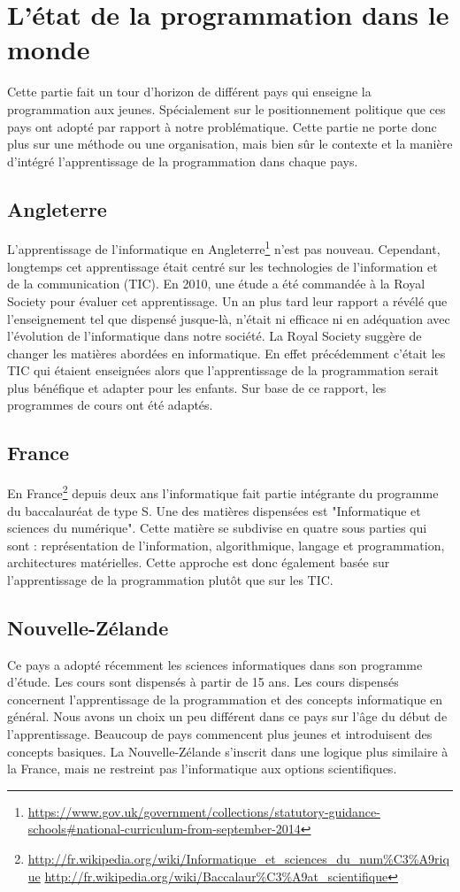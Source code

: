 \section{L'état de la programmation dans le monde}
\label{monde}
Cette partie fait un tour d'horizon de différent pays qui enseigne la programmation aux jeunes. Spécialement sur le positionnement politique que ces pays ont adopté par rapport à notre problématique. Cette partie ne porte donc plus sur une méthode ou une organisation, mais bien sûr le contexte et la manière d'intégré l'apprentissage de la programmation dans chaque pays.
\subsection{Angleterre}
L'apprentissage de l'informatique en Angleterre\footnote{\url{https://www.gov.uk/government/collections/statutory-guidance-schools\#national-curriculum-from-september-2014}} n'est pas nouveau. Cependant, longtemps cet apprentissage était centré sur les technologies de l'information et de la communication (TIC). En 2010, une étude a été commandée à la Royal Society pour évaluer cet apprentissage. Un an plus tard leur rapport a révélé que l'enseignement tel que dispensé jusque-là, n'était ni efficace ni en adéquation avec l'évolution de l'informatique dans notre société. La Royal Society suggère de changer les matières abordées en informatique. En effet précédemment c'était les TIC qui étaient enseignées alors que l'apprentissage de la programmation serait plus bénéfique et adapter pour les enfants. Sur base de ce rapport, les programmes de cours ont été adaptés.

\subsection{France}
En France\footnote{\url{http://fr.wikipedia.org/wiki/Informatique\_et\_sciences\_du\_num\%C3\%A9rique}
\url{http://fr.wikipedia.org/wiki/Baccalaur\%C3\%A9at\_scientifique}} depuis deux ans l'informatique fait partie intégrante du programme du baccalauréat de type S. Une des matières dispensées est "Informatique et sciences du numérique". Cette matière se subdivise en quatre sous parties qui sont : représentation de l'information, algorithmique, langage et programmation, architectures matérielles. Cette approche est donc également basée sur l'apprentissage de la programmation plutôt que sur les TIC.

\subsection{Nouvelle-Zélande}
Ce pays a adopté récemment les sciences informatiques dans son programme d'étude. Les cours sont dispensés à partir de 15 ans. Les cours dispensés concernent l'apprentissage de la programmation et des concepts informatique en général. Nous avons un choix un peu différent dans ce pays sur l'âge du début de l'apprentissage. Beaucoup de pays commencent plus jeunes et introduisent des concepts basiques. La Nouvelle-Zélande s'inscrit dans une logique plus similaire à la France, mais ne restreint pas l'informatique aux options scientifiques.

